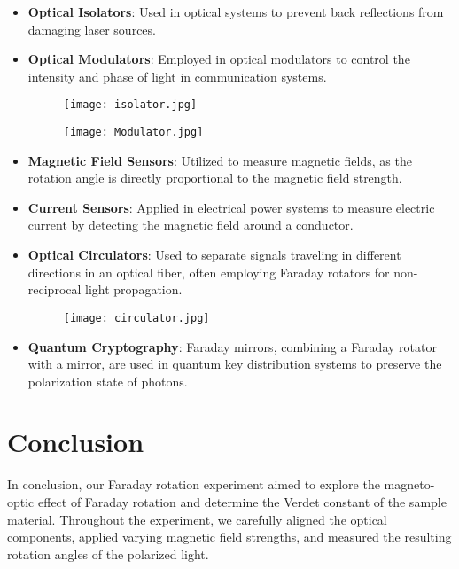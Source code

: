 \documentclass[11pt]{article}
\begin{document}
	\begin{itemize}
		\item \textbf{Optical Isolators}: Used in optical systems to prevent back reflections from damaging laser sources.
		\item \textbf{Optical Modulators}: Employed in optical modulators to control the intensity and phase of light in communication systems.
		\begin{figure}[htbp]
			\centering
			\begin{minipage}{0.45\textwidth}
				\centering
				\texttt{[image: isolator.jpg]}
				\label{fig:image1}
			\end{minipage}\hfill
			\begin{minipage}{0.45\textwidth}
				\centering
				\texttt{[image: Modulator.jpg]}
				\label{fig:image2}
			\end{minipage}
		\end{figure}
		\item \textbf{Magnetic Field Sensors}: Utilized to measure magnetic fields, as the rotation angle is directly proportional to the magnetic field strength.
		\item \textbf{Current Sensors}: Applied in electrical power systems to measure electric current by detecting the magnetic field around a conductor.
		\item \textbf{Optical Circulators}: Used to separate signals traveling in different directions in an optical fiber, often employing Faraday rotators for non-reciprocal light propagation.
		\begin{figure}[htbp]
			\centering
			\texttt{[image: circulator.jpg]}
		\end{figure}
		\item \textbf{Quantum Cryptography}: Faraday mirrors, combining a Faraday rotator with a mirror, are used in quantum key distribution systems to preserve the polarization state of photons.
	\end{itemize}


\clearpage

	\section{Conclusion}

	In conclusion, our Faraday rotation experiment aimed to explore the magneto-optic effect of Faraday rotation and determine the Verdet constant of the sample material. Throughout the experiment, we carefully aligned the optical components, applied varying magnetic field strengths, and measured the resulting rotation angles of the polarized light.
\end{document}
